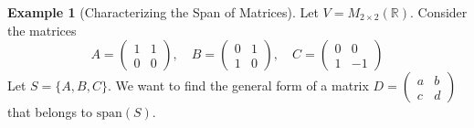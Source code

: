 \documentclass[11pt]{article}
\theoremstyle{definition}
\newtheorem{example}[theorem]{Example}
\newcommand{\R}{\mathbb{R}}
\newcommand{\M}[2]{M_{#1 \times #2}}
\newcommand{\Span}[1]{\text{span}(#1)}
\begin{document}
\begin{example}[Characterizing the Span of Matrices]
Let $V = \M{2}{2}(\R)$. Consider the matrices
\[ A = \begin{pmatrix} 1 & 1 \\ 0 & 0 \end{pmatrix}, \quad B = \begin{pmatrix} 0 & 1 \\ 1 & 0 \end{pmatrix}, \quad C = \begin{pmatrix} 0 & 0 \\ 1 & -1 \end{pmatrix} \]
Let $S = \{A, B, C\}$. We want to find the general form of a matrix $D = \begin{pmatrix} a & b \\ c & d \end{pmatrix}$ that belongs to $\Span{S}$.


\end{example}
\end{document}
